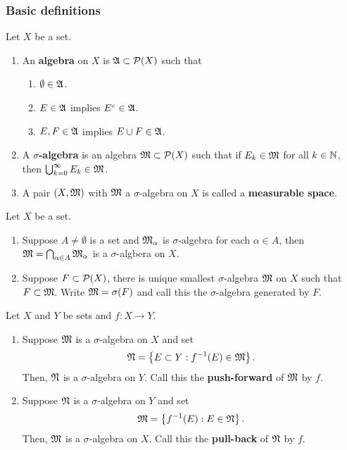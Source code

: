 \documentclass[a4paper]{article}
\begin{document}
\subsubsection{Basic definitions}

\begin{defi}
  Let $X$ be a set. 
  \begin{enumerate}
    \item An \textbf{algebra} on $X$ is $\afk \subset 
    \P(X)$ such that 
    \begin{enumerate}
      \item $\emptyset \in \afk$.
      \item $E \in \afk$ implies $E^c \in \afk$.
      \item $E, F \in \afk$ implies $E \cup F \in \afk$.
    \end{enumerate}
    
    \item A \textbf{$\sigma$-algebra} is an algebra 
    $\mf \subset \P(X)$ such that if 
    $E_k \in \mf$ for all $k \in \N$, then 
    $\cupinfk E_k \in \mf$. 

    \item A pair $(X, \mf)$ with $\mf$ a $\sigma$-algebra 
    on $X$ is called a \textbf{measurable space}.
  \end{enumerate}
\end{defi}

\begin{thm}
  Let $X$ be a set.
  \begin{enumerate}
    \item Suppose $A \neq \emptyset$ is a set and 
    $\mf_\alpha$ is $\sigma$-algebra for each $
    \alpha \in A$, then $\mf = \bigcap_{\alpha \in A} 
    \mf_\alpha$ is a $\sigma$-algbera on $X$. 

    \item Suppose $F \subset \P(X)$, there is unique 
    smallest $\sigma$-algebra $\mf$ on $X$ such that 
    $F \subset \mf$. Write $\mf = \sigma(F)$ and call 
    this the $\sigma$-algebra generated by $F$.
  \end{enumerate}
\end{thm}

\begin{thm}
  Let $X$ and $Y$ be sets and $f: X \to Y$.
  \begin{enumerate}
    \item Suppose $\mf$ is a $\sigma$-algebra on $X$ 
    and set 
    \[
    \nf = \left\{ E \subset Y: 
    f^{-1}(E) \in \mf \right\}.
    \]
    Then, $\nf$ is a $\sigma$-algebra on $Y$.
    Call this the \textbf{push-forward} of $\mf$ 
    by $f$.

    \item Suppose $\nf$ is a $\sigma$-algebra 
    on $Y$ and set 
    \[
    \mf = \left\{ f^{-1}(E) : E \in \nf \right\}.
    \]
    Then, $\mf$ is a $\sigma$-algebra on $X$. Call 
    this the \textbf{pull-back} of $\nf$ by $f$.
  \end{enumerate}
\end{thm}
\end{document}
